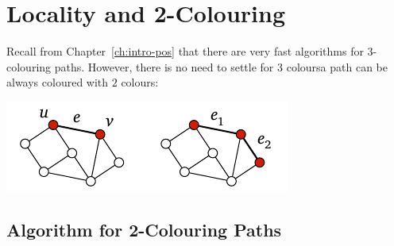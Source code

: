 \section{Locality and 2-Colouring}\label{sec:intro-neg-simple}

Recall from Chapter~\ref{ch:intro-pos} that there are very fast algorithms for $3$-colouring paths. However, there is no need to settle for $3$ colours\mydash a path can be always coloured with $2$ colours:
\begin{center}
    \includegraphics[page=\PIntroColTwo]{figs.pdf}
\end{center}


\subsection{Algorithm for 2-Colouring Paths}\label{ssec:algo-p2c}

